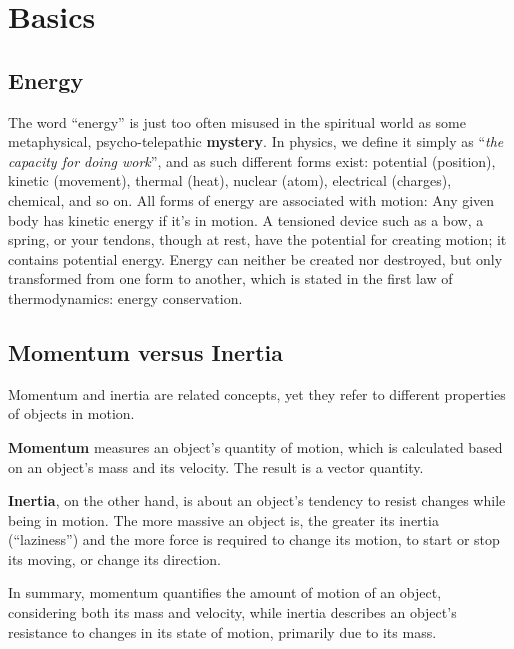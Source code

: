 \section{Basics}\label{sec:basics}

\subsection{Energy}\label{subsec:energy}

The word ``energy'' is just too often misused in the spiritual world as some metaphysical, psycho-telepathic \textbf{mystery}.
In physics, we define it simply as ``\textit{the capacity for doing work}'', and as such different forms exist: potential (position), kinetic (movement), thermal (heat), nuclear (atom), electrical (charges), chemical, and so on.
All forms of energy are associated with motion: Any given body has kinetic energy if it's in motion.
A tensioned device such as a bow, a spring, or your tendons, though at rest, have the potential for creating motion; it contains potential energy.
Energy can neither be created nor destroyed, but only transformed from one form to another, which is stated in the first law of thermodynamics: energy conservation.


\subsection{Momentum versus Inertia}\label{subsec:momentum-versus-inertia}

Momentum and inertia are related concepts, yet they refer to different properties of objects in motion.

\textbf{Momentum} measures an object's quantity of motion, which is calculated based on an object's mass and its velocity.
The result is a vector quantity.

\textbf{Inertia}, on the other hand, is about an object's tendency to resist changes while being in motion.
The more massive an object is, the greater its inertia (``laziness'') and the more force is required to change its motion, to start or stop its moving, or change its direction.

In summary, momentum quantifies the amount of motion of an object, considering both its mass and velocity, while inertia describes an object's resistance to changes in its state of motion, primarily due to its mass.

